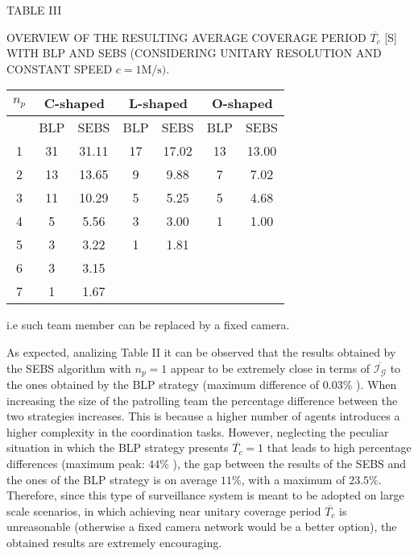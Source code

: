 \documentclass[conference]{IEEEtran}
\begin{document}
TABLE III

OVERVIEW OF THE RESULTING AVERAGE COVERAGE PERIOD $\overline{T_{c}}$ [S] WITH BLP AND SEBS (CONSIDERING UNITARY RESOLUTION AND CONSTANT SPEED $c=1 \mathrm{M} / \mathrm{s})$.

\begin{center}
\begin{tabular}{|c|c|c|c|c|c|c|}
\hline
\multirow[b]{2}{*}{$n_{p}$} & \multicolumn{2}{|c|}{C-shaped} & \multicolumn{2}{|c|}{L-shaped} & \multicolumn{2}{|c|}{O-shaped} \\
\hline
 & BLP & SEBS & BLP & SEBS & BLP & SEBS \\
\hline
1 & 31 & 31.11 & 17 & 17.02 & 13 & 13.00 \\
\hline
2 & 13 & 13.65 & 9 & 9.88 & 7 & 7.02 \\
\hline
3 & 11 & 10.29 & 5 & 5.25 & 5 & 4.68 \\
\hline
4 & 5 & 5.56 & 3 & 3.00 & 1 & 1.00 \\
\hline
5 & 3 & 3.22 & 1 & 1.81 &  &  \\
\hline
6 & 3 & 3.15 &  &  &  &  \\
\hline
7 & 1 & 1.67 &  &  &  &  \\
\hline
\end{tabular}
\end{center}

i.e such team member can be replaced by a fixed camera.

As expected, analizing Table II it can be observed that the results obtained by the SEBS algorithm with $n_{p}=1$ appear to be extremely close in terms of $\overline{\mathcal{I}_{\mathcal{G}}}$ to the ones obtained by the BLP strategy (maximum difference of $0.03 \%$ ). When increasing the size of the patrolling team the percentage difference between the two strategies increases. This is because a higher number of agents introduces a higher complexity in the coordination tasks. However, neglecting the peculiar situation in which the BLP strategy presents $\overline{T_{c}}=1$ that leads to high percentage differences (maximum peak: $44 \%$ ), the gap between the results of the SEBS and the ones of the BLP strategy is on average $11 \%$, with a maximum of $23.5 \%$. Therefore, since this type of surveillance system is meant to be adopted on large scale scenarios, in which achieving near unitary coverage period $\overline{T_{c}}$ is unreasonable (otherwise a fixed camera network would be a better option), the obtained results are extremely encouraging.
\end{document}
